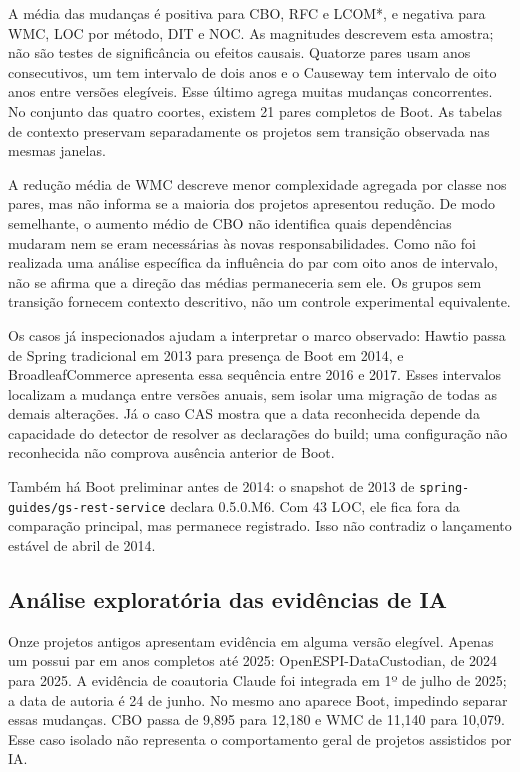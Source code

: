 A média das mudanças é positiva para CBO, RFC e LCOM*, e negativa para WMC, LOC por método, DIT e NOC. As magnitudes descrevem esta amostra; não são testes de significância ou efeitos causais. Quatorze pares usam anos consecutivos, um tem intervalo de dois anos e o Causeway tem intervalo de oito anos entre versões elegíveis. Esse último agrega muitas mudanças concorrentes. No conjunto das quatro coortes, existem 21 pares completos de Boot. As tabelas de contexto preservam separadamente os projetos sem transição observada nas mesmas janelas.

A redução média de WMC descreve menor complexidade agregada por classe nos pares, mas não informa se a maioria dos projetos apresentou redução. De modo semelhante, o aumento médio de CBO não identifica quais dependências mudaram nem se eram necessárias às novas responsabilidades. Como não foi realizada uma análise específica da influência do par com oito anos de intervalo, não se afirma que a direção das médias permaneceria sem ele. Os grupos sem transição fornecem contexto descritivo, não um controle experimental equivalente.

Os casos já inspecionados ajudam a interpretar o marco observado: Hawtio passa de Spring tradicional em 2013 para presença de Boot em 2014, e BroadleafCommerce apresenta essa sequência entre 2016 e 2017. Esses intervalos localizam a mudança entre versões anuais, sem isolar uma migração de todas as demais alterações. Já o caso CAS mostra que a data reconhecida depende da capacidade do detector de resolver as declarações do build; uma configuração não reconhecida não comprova ausência anterior de Boot.

Também há Boot preliminar antes de 2014: o snapshot de 2013 de \texttt{spring-guides/gs-rest-service} declara 0.5.0.M6. Com 43 LOC, ele fica fora da comparação principal, mas permanece registrado. Isso não contradiz o lançamento estável de abril de 2014.

\subsection{Análise exploratória das evidências de IA}
\label{subsec:historico-ia}

Onze projetos antigos apresentam evidência em alguma versão elegível. Apenas um possui par em anos completos até 2025: OpenESPI-DataCustodian, de 2024 para 2025. A evidência de coautoria Claude foi integrada em 1º de julho de 2025; a data de autoria é 24 de junho. No mesmo ano aparece Boot, impedindo separar essas mudanças. CBO passa de 9,895 para 12,180 e WMC de 11,140 para 10,079. Esse caso isolado não representa o comportamento geral de projetos assistidos por IA.

